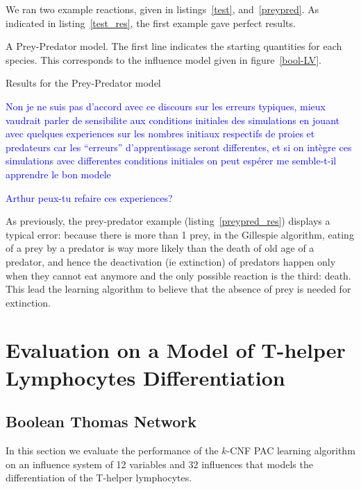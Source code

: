 \documentclass{llncs}
\newcommand{\francois}[1]{\textcolor{blue}{#1}}
\begin{document}
We ran two example reactions, given in listings~\ref{test}, and~\ref{preypred}. As indicated in listing~\ref{test_res}, the first example gave perfect results.

\begin{listfig}[hp]
	
	\caption{A Prey-Predator model. The first line indicates the starting quantities for each species. This corresponds to the influence model given in figure~\ref{bool-LV}.\label{preypred}}
\end{listfig}
\begin{listfig}[hp]
	
	\caption{Results for the Prey-Predator model\label{preypred_res}}
\end{listfig}

\francois{Non je ne suis pas d'accord avec ce discours sur les erreurs typiques,
mieux vaudrait parler de sensibilite aux conditions initiales des simulations
en jouant avec quelques experiences sur les nombres initiaux respectifs de proies et predateurs
car les ``erreurs'' d'apprentissage seront differentes,
et si on intègre ces simulations avec differentes conditions initiales on peut espérer me semble-t-il apprendre le bon modele}

\francois{Arthur peux-tu refaire ces experiences?}

As previously, the prey-predator example (listing~\ref{preypred_res}) displays a typical error: because there is more than 1 prey, in the Gillespie algorithm, eating of a prey by a predator is way more likely than the death of old age of a predator, and hence the deactivation (ie extinction) of predators happen only when they cannot eat anymore and the only possible reaction is the third: death. This lead the learning algorithm to believe that the absence of prey is needed for extinction.


\section{Evaluation on a Model of T-helper Lymphocytes Differentiation}\label{ex:lympho}


\subsection{Boolean Thomas Network}

In this section we evaluate the performance of the $k$-CNF PAC learning
algorithm on an influence system of 12 variables and 32 influences that models
the differentiation of the T-helper lymphocytes.
\end{document}
